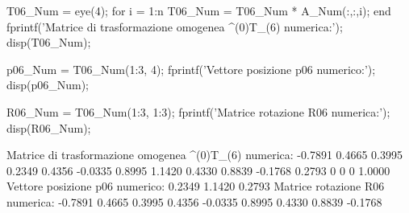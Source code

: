 \documentclass[11pt, a4paper]{article}
\begin{document}
\newpage
\begin{matlabcode}
T06_Num = eye(4);
for i = 1:n
    T06_Num = T06_Num * A_Num(:,:,i);
end
fprintf('Matrice di trasformazione omogenea ^(0)T_(6) numerica:\n');
disp(T06_Num);

p06_Num = T06_Num(1:3, 4);
fprintf('Vettore posizione p06 numerico:\n');
disp(p06_Num);

R06_Num = T06_Num(1:3, 1:3);
fprintf('Matrice rotazione R06 numerica:\n');
disp(R06_Num);
\end{matlabcode}
\begin{matlaboutput}
Matrice di trasformazione omogenea ^(0)T_(6) numerica:
   -0.7891    0.4665    0.3995    0.2349
    0.4356   -0.0335    0.8995    1.1420
    0.4330    0.8839   -0.1768    0.2793
         0         0         0    1.0000
Vettore posizione p06 numerico:
    0.2349
    1.1420
    0.2793
Matrice rotazione R06 numerica:
   -0.7891    0.4665    0.3995
    0.4356   -0.0335    0.8995
    0.4330    0.8839   -0.1768
\end{matlaboutput}
\end{document}
